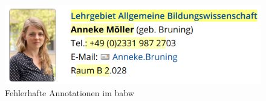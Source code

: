     \begin{figure}[htb]
        \centering
        \includegraphics[scale=\screenshotScaleFactor]{../resources/findings/case-study-1/babw/annotations/missing-annotation.png}
        \caption{Fehlerhafte Annotationen im \acrshort{babw}}
        \label{image:findingTeachersBaBwWrongAnnotations}
    \end{figure}
